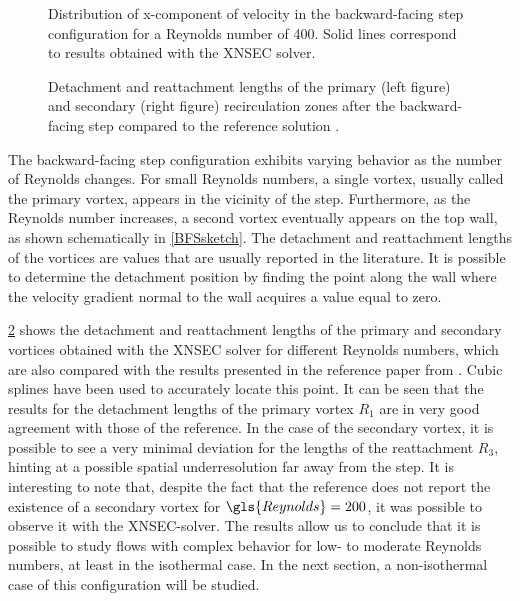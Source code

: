 \begin{figure}[bt]
	\centering
	\caption[Distribution of x-component of velocity in the backward-facing step configuration for a Reynolds number of 400.]{Distribution of x-component of velocity in the backward-facing step configuration for a Reynolds number of 400. Solid lines correspond to results obtained with the XNSEC solver.}
	\label{fig:uvelBFS}
\end{figure}



\begin{figure}[tb]
	\centering
	\caption[Detachment and reattachment lengths of the primary and secondary recirculation zones after the backward-facing step compared to the reference solution]{ Detachment and reattachment lengths of the primary (left figure) and secondary (right figure) recirculation zones after the backward-facing step compared to the reference solution \parencite{biswasBackwardFacingStepFlows2004}.}
	\label{fig:Re_De_Attachmentlengths}
\end{figure}
The backward-facing step configuration exhibits varying behavior as the number of Reynolds changes. For small Reynolds numbers, a single vortex, usually called the primary vortex, appears in the vicinity of the step. Furthermore, as the Reynolds number increases, a second vortex eventually appears on the top wall, as shown schematically in \cref{BFSsketch}.
The detachment and reattachment lengths of the vortices are values that are usually reported in the literature. It is possible to determine the detachment position by finding the point along the wall where the velocity gradient normal to the wall acquires a value equal to zero. 

\cref{fig:Re_De_Attachmentlengths} shows the detachment and reattachment lengths of the primary and secondary vortices obtained with the XNSEC solver for different Reynolds numbers, which are also compared with the results presented in the reference paper from \textcite{biswasBackwardFacingStepFlows2004}. Cubic splines have been used to accurately locate this point. It can be seen that the results for the detachment lengths of the primary vortex $R_1$ are in very good agreement with those of the reference. In the case of the secondary vortex, it is possible to see a very minimal deviation for the lengths of the reattachment $R_3$, hinting at a possible spatial underresolution far away from the step. It is interesting to note that, despite the fact that the reference does not report the existence of a secondary vortex for $\gls{Reynolds} = 200$, it was possible to observe it with the XNSEC-solver. The results allow us to conclude that it is possible to study flows with complex behavior for low- to moderate Reynolds numbers, at least in the isothermal case. In the next section, a non-isothermal case of this configuration will be studied.

